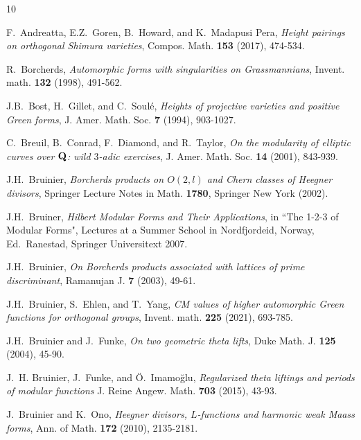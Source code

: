 \documentclass{amsart}
\theoremstyle{definition}
\theoremstyle{definition}
\theoremstyle{definition}
\begin{document}
\begin{thebibliography}{10}

 F.~Andreatta, E.Z.~Goren, B.~Howard, and K.~Madapusi Pera, {\it{Height pairings on orthogonal Shimura varieties}}, 
Compos. Math. {\bf{153}} (2017), 474-534.


 R.~Borcherds, {\it{Automorphic forms with singularities on Grassmannians}}, Invent. math. {\bf{132}} (1998), 491-562.

 J.B.~Bost, H.~Gillet, and C.~Soul\'e, {\it{Heights of projective varieties and positive Green forms}}, J. Amer. Math. Soc. {\bf{7}} (1994), 903-1027.

 C.~Breuil, B.~Conrad, F.~Diamond, and R.~Taylor, {\it{On the modularity of elliptic curves over ${\bf{Q}}$: wild $3$-adic exercises}},
\newblock J. Amer. Math. Soc. {\bf{14}} (2001), 843-939.

 J.H.~Bruinier, {\it{Borcherds products on $O(2, l)$ and Chern classes of Heegner divisors}}, 
Springer Lecture Notes in Math. {\bf{1780}}, Springer New York (2002).

 J.H.~Bruiner, {\it{Hilbert Modular Forms and Their Applications}}, in ``The 1-2-3 of Modular Forms", Lectures at a Summer School in
Nordfjordeid, Norway, Ed.~Ranestad, Springer Universitext 2007.

 J.H.~Bruinier, {\it{On Borcherds products associated with lattices of prime discriminant}}, Ramanujan J. {\bf{7}} (2003), 49-61.

 J.H.~Bruinier, S.~Ehlen, and T.~Yang, {\it{CM values of higher automorphic Green functions for orthogonal groups}}, Invent. math. {\bf{225}} (2021), 693-785. 

 J.H.~Bruinier and J.~Funke, {\it{On two geometric theta lifts}}, Duke Math. J. {\bf{125}} (2004), 45-90.

 J.~H. Bruinier, J.~Funke, and \"O.~Imamo{\u{g}}lu, {\it{Regularized theta liftings and periods of modular functions}} 
J. Reine Angew. Math. {\bf{703}} (2015), 43-93.

 J.~Bruinier and K.~Ono, {\it{Heegner divisors, $L$-functions and harmonic weak Maass forms}}, Ann. of Math. {\bf{172}} (2010), 2135-2181.


\end{thebibliography}
\end{document}
